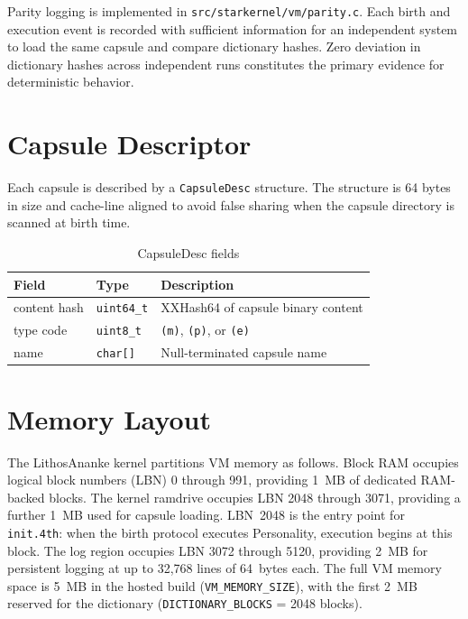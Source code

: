 Parity logging is implemented in \texttt{src/starkernel/vm/parity.c}.
Each birth and execution event is recorded with sufficient information
for an independent system to load the same capsule and compare dictionary
hashes. Zero deviation in dictionary hashes across independent runs
constitutes the primary evidence for deterministic behavior.

\section{Capsule Descriptor}
\label{vol2:sec:capsules:descriptor}


Each capsule is described by a \texttt{CapsuleDesc} structure. The structure
is 64 bytes in size and cache-line aligned to avoid false sharing when the
capsule directory is scanned at birth time.

\begin{table}[ht]
  \centering
  \caption{CapsuleDesc fields}
  \label{tab:capsule-desc}
  \begin{tabular}{lll}
    \toprule
    Field & Type & Description \\
    \midrule
    content hash & \texttt{uint64\_t} & XXHash64 of capsule binary content \\
    type code & \texttt{uint8\_t} & \texttt{(m)}, \texttt{(p)}, or \texttt{(e)} \\
    name & \texttt{char[]} & Null-terminated capsule name \\
    \bottomrule
  \end{tabular}
\end{table}


\section{Memory Layout}
\label{vol2:sec:capsules:memory}


The LithosAnanke kernel partitions VM memory as follows. Block RAM occupies
logical block numbers (LBN) 0 through 991, providing 1~MB of dedicated
RAM-backed blocks. The kernel ramdrive occupies LBN 2048 through 3071,
providing a further 1~MB used for capsule loading. LBN~2048 is the entry
point for \texttt{init.4th}: when the birth protocol executes Personality,
execution begins at this block. The log region occupies LBN 3072 through
5120, providing 2~MB for persistent logging at up to 32,768 lines of
64~bytes each. The full VM memory space is 5~MB in the hosted build
(\texttt{VM\_MEMORY\_SIZE}), with the first 2~MB reserved for the
dictionary (\texttt{DICTIONARY\_BLOCKS} = 2048 blocks).


